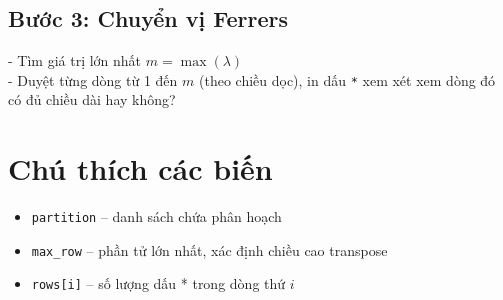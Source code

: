 \documentclass[12pt]{article}
\begin{document}
\subsection*{Bước 3: Chuyển vị Ferrers}
- Tìm giá trị lớn nhất $m = \max(\lambda)$ \\
- Duyệt từng dòng từ 1 đến $m$ (theo chiều dọc), in dấu \texttt{*} xem xét xem dòng đó có đủ chiều dài hay không?

\section*{Chú thích các biến}
\begin{itemize}[itemsep=0pt]
    \item \texttt{partition} – danh sách chứa phân hoạch
    \item \texttt{max\_row} – phần tử lớn nhất, xác định chiều cao transpose
    \item \texttt{rows[i]} – số lượng dấu * trong dòng thứ $i$
\end{itemize}
\end{document}
